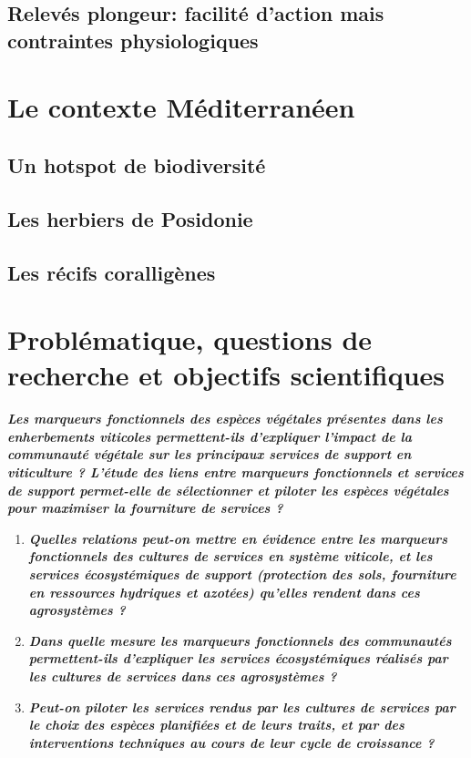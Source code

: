 \subsection{Relevés plongeur: facilité d'action mais contraintes physiologiques}\label{intro.2.3}

\newpage

\section{Le contexte Méditerranéen}\label{intro.3}
\subsection{Un hotspot de biodiversité}\label{intro.3.1}
\subsection{Les herbiers de Posidonie}\label{intro.3.2}
\subsection{Les récifs coralligènes}\label{intro.3.3}

\newpage

\section[Problématique et objectifs scientifiques]{Problématique, questions de recherche et objectifs scientifiques}\label{intro.4}


\medskip
\noindent\textbf{\textit{Les marqueurs fonctionnels des espèces végétales présentes dans les enherbements viticoles permettent-ils d'expliquer l'impact de la communauté végétale sur les principaux services de support en viticulture ? L'étude des liens entre marqueurs fonctionnels et services de support permet-elle de sélectionner et piloter les espèces végétales pour maximiser la fourniture de services ?}}
\medskip


\begin{enumerate}[leftmargin=*]
\item \textbf{\textit{Quelles relations peut-on mettre en évidence entre les marqueurs fonctionnels des cultures de services en système viticole, et les services écosystémiques de support (protection des sols, fourniture en ressources hydriques et azotées) qu'elles rendent dans ces agrosystèmes ?}}
\item \textbf{\textit{Dans quelle mesure les marqueurs fonctionnels des communautés permettent-ils d'expliquer les services écosystémiques réalisés par les cultures de services dans ces agrosystèmes ?}}
\item \textbf{\textit{Peut-on piloter les services rendus par les cultures de services par le choix des espèces planifiées et de leurs traits, et par des interventions techniques au cours de leur cycle de croissance ?}}
\end{enumerate}


